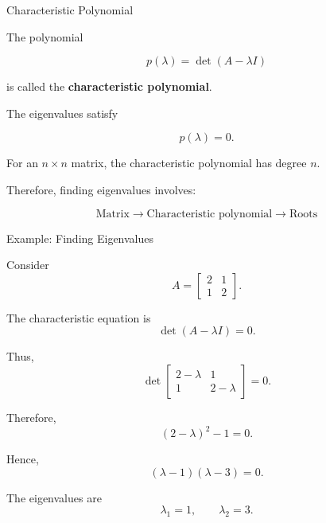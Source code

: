 
\begin{frame}{Characteristic Polynomial}

The polynomial

\[
\boxed{
p(\lambda)=\det(A-\lambda I)
}
\]

is called the \textbf{characteristic polynomial}.

The eigenvalues satisfy

\[
\boxed{
p(\lambda)=0.
}
\]

For an $n\times n$ matrix, the characteristic polynomial
has degree $n$.

\vspace{0.4cm}

Therefore, finding eigenvalues involves:

\[
\boxed{
\text{Matrix}
\rightarrow
\text{Characteristic polynomial}
\rightarrow
\text{Roots}
}
\]

\end{frame}



\begin{frame}{Example: Finding Eigenvalues}

Consider
\vspace{-0.1cm}
\[
A=
\begin{bmatrix}
2&1\\
1&2
\end{bmatrix}.
\]

The characteristic equation is
\vspace{-0.1cm}
\[
\det(A-\lambda I)=0.
\]

Thus,
\vspace{-0.1cm}
\[
\det
\begin{bmatrix}
2-\lambda&1\\
1&2-\lambda
\end{bmatrix}
=0.
\]

Therefore,
\vspace{-0.1cm}
\[
(2-\lambda)^2-1=0.
\]

Hence,
\vspace{-0.1cm}
\[
(\lambda-1)(\lambda-3)=0.
\]

The eigenvalues are
\vspace{-0.1cm}
\[
\boxed{
\lambda_1=1,
\qquad
\lambda_2=3.
}
\]

\end{frame}


